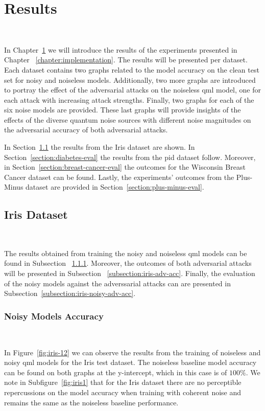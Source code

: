 \chapter{Results}\label{chapter:results} \

In Chapter~\ref{chapter:results} we will introduce
the results of the experiments presented in Chapter
~\ref{chapter:implementation}. The results will be presented
per dataset. Each dataset contains two graphs related to
the model accuracy on the clean test set for noisy and
noiseless models. Additionally, two more graphs are
introduced to portray the effect of the adversarial
attacks on the noiseless \ac{qml} model, one for each
attack with increasing attack strengths. Finally, two
graphs for each of the six noise models are provided.
These last graphs will provide insights of the effects
of the diverse quantum noise sources with different noise 
magnitudes on the adversarial accuracy of both adversarial
attacks. \

In Section~\ref{section:iris-eval} the results from
the Iris dataset are shown. In Section~\ref{section:diabetes-eval}
the results from the \ac{pid} dataset follow. Moreover,
in Section~\ref{section:breast-cancer-eval} the outcomes
for the Wisconsin Breast Cancer dataset can be found.
Lastly, the experiments' outcomes from the Plus-Minus dataset
are provided in Section~\ref{section:plus-minus-eval}. \

\section{Iris Dataset}\label{section:iris-eval} \

The results obtained from training the noisy and noiseless
\ac{qml} models can be found in Subsection
~\ref{subsection:iris-noisy-acc}. Moreover, the outcomes
of both adversarial attacks will be presented in Subsection
~\ref{subsection:iris-adv-acc}. Finally, the evaluation
of the noisy models against the adverssarial attacks can
are presented in Subsection~\ref{subsection:iris-noisy-adv-acc}. \

\subsection{Noisy Models Accuracy}\label{subsection:iris-noisy-acc} \

In Figure~\ref{fig:iris-12} we can observe the results
from the training of noiseless and noisy \ac{qml} models
for the Iris test dataset. The noiseless baseline model accuracy
can be found on both graphs at the y-intercept, which in
this case is of \(100\%\). We note in Subfigure~\ref{fig:iris1}
that for the Iris dataset there are no perceptible
repercussions on the model accuracy when training with
coherent noise and remains the same as the noiseless
baseline performance. \

